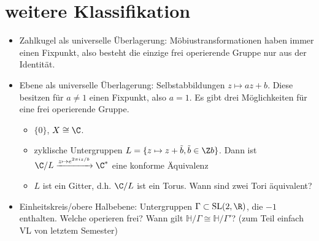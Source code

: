 \documentclass{article}
\begin{document}
        \section{weitere Klassifikation}
        \begin{itemize}
            \item Zahlkugel als universelle Überlagerung: Möbiustransformationen haben immer einen Fixpunkt, also besteht die einzige frei operierende Gruppe nur aus der Identität.
            \item Ebene als universelle Überlagerung: Selbstabbildungen $z \mapsto az + b$. Diese besitzen für $a \neq 1$ einen Fixpunkt, also $a = 1$. Es gibt drei Möglichkeiten für eine frei operierende Gruppe.
            \begin{itemize}
                \item $\{0\}$, $X \cong \C$.
                \item zyklische Untergruppen $L = \{z \mapsto z + \tilde{b}, \tilde{b} \in \Z b\}$. Dann ist $\C/L \xrightarrow{z \mapsto e^{2\pi i z/b}} \C^*$ eine konforme Äquivalenz
                \item $L$ ist ein Gitter, d.h. $\C/L$ ist ein Torus. Wann sind zwei Tori äquivalent?
            \end{itemize}
            \item Einheitskreis/obere Halbebene: Untergruppen $\Gamma \subset \operatorname{SL}(2,\R)$, die $-1$ enthalten. Welche operieren frei? Wann gilt $\mathbb{H}/\Gamma \cong \mathbb{H}/\Gamma'$? (zum Teil einfach VL von letztem Semester)
        \end{itemize}
    
\end{document}
